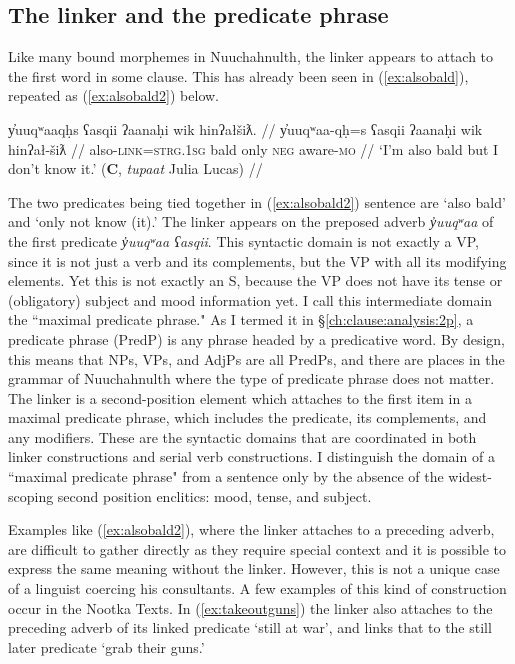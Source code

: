 
\subsection{The linker and the predicate phrase} \label{ch:link:2p}

Like many bound morphemes in Nuuchahnulth, the linker appears to attach to the first word in some clause. This has already been seen in (\ref{ex:alsobald}), repeated as (\ref{ex:alsobald2}) below.

\ex \label{ex:alsobald2}
\begingl
\glpreamble y̓uuqʷaaqḥs ʕasqii ʔaanaḥi wik hinʔałšiƛ. //
\gla y̓uuqʷaa-qḥ=s ʕasqii ʔaanaḥi wik hinʔał-šiƛ //
\glb also-\textsc{link}=\textsc{strg.1sg} bald only \textsc{neg} aware-\textsc{mo} //
\glft `I'm also bald but I don't know it.' (\textbf{C}, \textit{tupaat} Julia Lucas) //
\endgl
\xe

The two predicates being tied together in (\ref{ex:alsobald2}) sentence are `also bald' and `only not know (it).' The linker appears on the preposed adverb \textit{y̓uuqʷaa} of the first predicate \textit{y̓uuqʷaa ʕasqii}.	This syntactic domain is not exactly a VP, since it is not just a verb and its complements, but the VP with all its modifying elements. Yet this is not exactly an S, because the VP does not have its tense or (obligatory) subject and mood information yet. I call this intermediate domain the ``maximal predicate phrase." As I termed it in \S\ref{ch:clause:analysis:2p}, a predicate phrase (PredP) is any phrase headed by a predicative word. By design, this means that NPs, VPs, and AdjPs are all PredPs, and there are places in the grammar of Nuuchahnulth where the type of predicate phrase does not matter. The linker is a second-position element which attaches to the first item in a maximal predicate phrase, which includes the predicate, its complements, and any modifiers. These are the syntactic domains that are coordinated in both linker constructions and serial verb constructions. I distinguish the domain of a ``maximal predicate phrase" from a sentence only by the absence of the widest-scoping second position enclitics: mood, tense, and subject.

Examples like (\ref{ex:alsobald2}), where the linker attaches to a preceding adverb, are difficult to gather directly as they require special context and it is possible to express the same meaning without the linker. However, this is not a unique case of a linguist coercing his consultants. A few examples of this kind of construction occur in the Nootka Texts. In (\ref{ex:takeoutguns}) the linker also attaches to the preceding adverb of its linked predicate `still at war', and links that to the still later predicate `grab their guns.'

